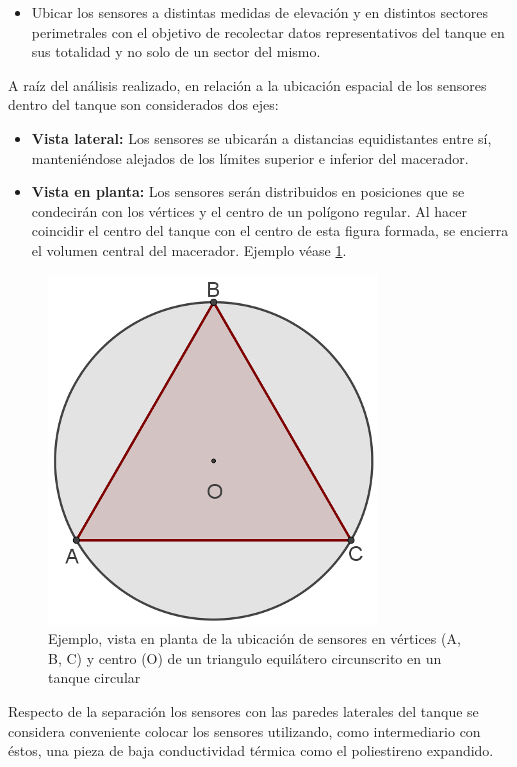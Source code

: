 \begin{itemize}
\begin{itemize}
            \item Ubicar los sensores a distintas medidas de elevación y en distintos sectores perimetrales con el objetivo de recolectar datos representativos del tanque en sus totalidad y no solo de un sector del mismo.
            
        \end{itemize}
       
        \par
        A raíz del análisis realizado, en relación a la ubicación espacial de los sensores dentro del tanque son considerados dos ejes:
        \begin{itemize}
            
            \item \textbf{Vista lateral: }Los sensores se ubicarán a distancias equidistantes entre sí, manteniéndose alejados de los límites superior e inferior del macerador.
            
            \item \textbf{Vista en planta: }Los sensores serán distribuidos en posiciones que se condecirán con los vértices y el centro de un polígono regular. Al hacer coincidir el centro del tanque con el centro de esta figura formada, se encierra el volumen central del macerador. Ejemplo véase \ref{fig:PosSens}.
            
        \end{itemize}
        
        \begin{figure}            
        \centering
            \includegraphics[scale = 0.4]{hardware/posicionesSensores.jpg}
            \caption{Ejemplo, vista en planta de la ubicación de sensores en vértices (A, B, C) y centro (O) de un triangulo equilátero circunscrito en un tanque circular }
            \label{fig:PosSens}
        \end{figure}
        
        \par
        Respecto de la separación los sensores con las paredes laterales del tanque se considera conveniente colocar los sensores utilizando, como intermediario con éstos, una pieza de baja conductividad térmica como el poliestireno expandido.
        
    \end{itemize}

